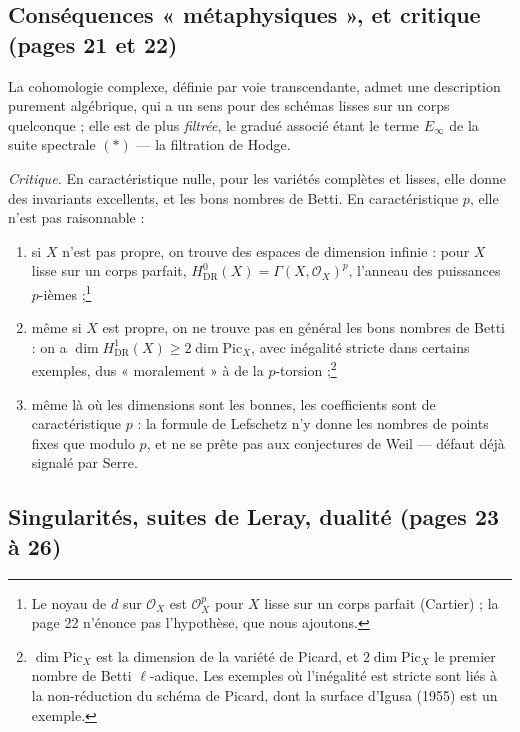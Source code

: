 \documentclass[11pt,a4paper]{article}
\begin{document}
\subsection*{Conséquences « métaphysiques », et critique (pages 21 et 22)}

La cohomologie complexe, définie par voie transcendante, admet une
description purement algébrique, qui a un sens pour des schémas lisses sur
un corps quelconque ; elle est de plus \emph{filtrée}, le gradué associé
étant le terme $E_\infty$ de la suite spectrale $(*)$ — la filtration de
Hodge.

\emph{Critique.} En caractéristique nulle, pour les variétés complètes et
lisses, elle donne des invariants excellents, et les bons nombres de Betti.
En caractéristique $p$, elle n'est pas raisonnable :
\begin{enumerate}
\item[1°)] si $X$ n'est pas propre, on trouve des espaces de dimension
  infinie : pour $X$ lisse sur un corps parfait, $H^{0}_{\mathrm{DR}}(X) =
  \Gamma(X, \mathcal{O}_X)^{p}$, l'anneau des puissances
  $p$-ièmes ;\footnote{Le noyau de $d$ sur $\mathcal{O}_X$ est
  $\mathcal{O}_X^{p}$ pour $X$ lisse sur un corps parfait (Cartier) ; la page
  22 n'énonce pas l'hypothèse, que nous ajoutons.}
\item[2°)] même si $X$ est propre, on ne trouve pas en général les bons
  nombres de Betti : on a $\dim H^{1}_{\mathrm{DR}}(X) \geq 2 \dim
  \mathrm{Pic}_X$, avec inégalité stricte dans certains exemples, dus
  « moralement » à de la $p$-torsion ;\footnote{$\dim \mathrm{Pic}_X$ est la
  dimension de la variété de Picard, et $2\dim\mathrm{Pic}_X$ le premier
  nombre de Betti $\ell$-adique. Les exemples où l'inégalité est stricte
  sont liés à la non-réduction du schéma de Picard, dont la surface d'Igusa
  (1955) est un exemple.}
\item[3°)] même là où les dimensions sont les bonnes, les coefficients sont
  de caractéristique $p$ : la formule de Lefschetz n'y donne les nombres de
  points fixes que modulo $p$, et ne se prête pas aux conjectures de Weil —
  défaut déjà signalé par Serre.
\end{enumerate}

\subsection*{Singularités, suites de Leray, dualité (pages 23 à 26)}
\end{document}
